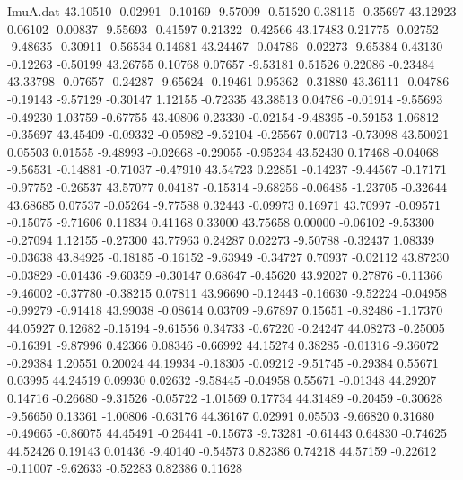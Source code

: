 \begin{filecontents}{ImuA.dat}
  43.10510   -0.02991   -0.10169   -9.57009   -0.51520    0.38115   -0.35697
  43.12923    0.06102   -0.00837   -9.55693   -0.41597    0.21322   -0.42566
  43.17483    0.21775   -0.02752   -9.48635   -0.30911   -0.56534    0.14681
  43.24467   -0.04786   -0.02273   -9.65384    0.43130   -0.12263   -0.50199
  43.26755    0.10768    0.07657   -9.53181    0.51526    0.22086   -0.23484
  43.33798   -0.07657   -0.24287   -9.65624   -0.19461    0.95362   -0.31880
  43.36111   -0.04786   -0.19143   -9.57129   -0.30147    1.12155   -0.72335
  43.38513    0.04786   -0.01914   -9.55693   -0.49230    1.03759   -0.67755
  43.40806    0.23330   -0.02154   -9.48395   -0.59153    1.06812   -0.35697
  43.45409   -0.09332   -0.05982   -9.52104   -0.25567    0.00713   -0.73098
  43.50021    0.05503    0.01555   -9.48993   -0.02668   -0.29055   -0.95234
  43.52430    0.17468   -0.04068   -9.56531   -0.14881   -0.71037   -0.47910
  43.54723    0.22851   -0.14237   -9.44567   -0.17171   -0.97752   -0.26537
  43.57077    0.04187   -0.15314   -9.68256   -0.06485   -1.23705   -0.32644
  43.68685    0.07537   -0.05264   -9.77588    0.32443   -0.09973    0.16971
  43.70997   -0.09571   -0.15075   -9.71606    0.11834    0.41168    0.33000
  43.75658    0.00000   -0.06102   -9.53300   -0.27094    1.12155   -0.27300
  43.77963    0.24287    0.02273   -9.50788   -0.32437    1.08339   -0.03638
  43.84925   -0.18185   -0.16152   -9.63949   -0.34727    0.70937   -0.02112
  43.87230   -0.03829   -0.01436   -9.60359   -0.30147    0.68647   -0.45620
  43.92027    0.27876   -0.11366   -9.46002   -0.37780   -0.38215    0.07811
  43.96690   -0.12443   -0.16630   -9.52224   -0.04958   -0.99279   -0.91418
  43.99038   -0.08614    0.03709   -9.67897    0.15651   -0.82486   -1.17370
  44.05927    0.12682   -0.15194   -9.61556    0.34733   -0.67220   -0.24247
  44.08273   -0.25005   -0.16391   -9.87996    0.42366    0.08346   -0.66992
  44.15274    0.38285   -0.01316   -9.36072   -0.29384    1.20551    0.20024
  44.19934   -0.18305   -0.09212   -9.51745   -0.29384    0.55671    0.03995
  44.24519    0.09930    0.02632   -9.58445   -0.04958    0.55671   -0.01348
  44.29207    0.14716   -0.26680   -9.31526   -0.05722   -1.01569    0.17734
  44.31489   -0.20459   -0.30628   -9.56650    0.13361   -1.00806   -0.63176
  44.36167    0.02991    0.05503   -9.66820    0.31680   -0.49665   -0.86075
  44.45491   -0.26441   -0.15673   -9.73281   -0.61443    0.64830   -0.74625
  44.52426    0.19143    0.01436   -9.40140   -0.54573    0.82386    0.74218
  44.57159   -0.22612   -0.11007   -9.62633   -0.52283    0.82386    0.11628

\end{filecontents}
